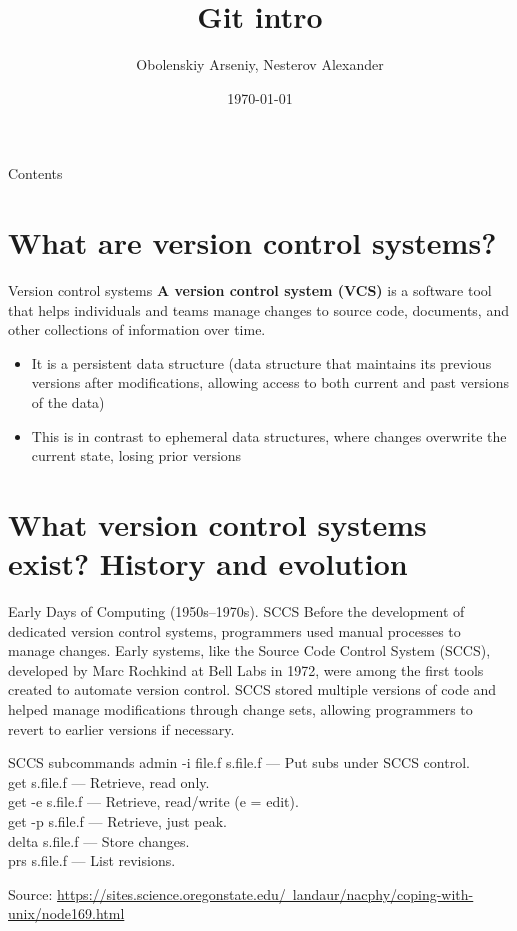 \documentclass{beamer}
\title[Git intro]{Git intro}
\author{Obolenskiy Arseniy, Nesterov Alexander}
\institute{ITLab}
\date{\today}
\begin{document}
\begin{frame}
    \titlepage%
\end{frame}

\begin{frame}{Contents}
    \tableofcontents
\end{frame}

\section{What are version control systems?}

\begin{frame}{Version control systems}
  \textbf{A version control system (VCS)} is a software tool that helps individuals and teams manage changes to source code, documents, and other collections of information over time.
  \begin{itemize}
    \item It is a persistent data structure (data structure that maintains its previous versions after modifications, allowing access to both current and past versions of the data)
    \item This is in contrast to ephemeral data structures, where changes overwrite the current state, losing prior versions
  \end{itemize}
\end{frame}

\section{What version control systems exist? History and evolution}

\begin{frame}{Early Days of Computing (1950s--1970s). SCCS}
  Before the development of dedicated version control systems, programmers used manual processes to manage changes. Early systems, like the Source Code Control System (SCCS), developed by Marc Rochkind at Bell Labs in 1972, were among the first tools created to automate version control. SCCS stored multiple versions of code and helped manage modifications through change sets, allowing programmers to revert to earlier versions if necessary.
  \begin{block}{SCCS subcommands}
    admin -i file.f s.file.f --- Put subs under SCCS control.\\
    get s.file.f --- Retrieve, read only.\\
    get -e s.file.f --- Retrieve, read/write (e = edit).\\
    get -p s.file.f --- Retrieve, just peak.\\
    delta s.file.f --- Store changes.\\
    prs s.file.f --- List revisions.\\
  \end{block}

  \footnotesize Source: \href{https://sites.science.oregonstate.edu/~landaur/nacphy/coping-with-unix/node169.html}{https://sites.science.oregonstate.edu/~landaur/nacphy/coping-with-unix/node169.html}
\end{frame}
\end{document}
